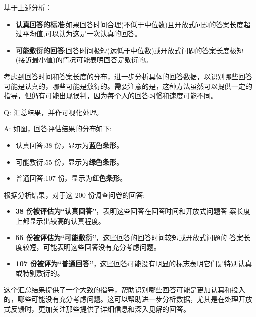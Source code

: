 基于上述分析：

\begin{itemize}
\item \textbf{认真回答的标准}:如果回答时间合理(不低于中位数)且开放式问题的答案长度超过平均值,可以认为这是一次认真的回答。
\item \textbf{可能敷衍的回答}:回答时间极短(远低于中位数)或开放式问题的答案长度极短(接近最小值)的情况可能表明回答是敷衍的。
\end{itemize}

考虑到回答时间和答案长度的分布，进一步分析具体的回答数据，以识别哪些回答可能是认真的，哪些可能是敷衍的。需要注意的是，这种方法虽然可以提供一定的指导，但仍有可能出现误判，因为每个人的回答习惯和速度可能不同。

Q:
汇总结果，并作可视化处理。

A:
如图，回答评估结果的分布如下:
\begin{itemize}
\item 认真回答:38 份，显示为\textbf{蓝色条形}。
\item 可能敷衍:55 份，显示为\textbf{绿色条形}。
\item 普通回答:107 份，显示为\textbf{红色条形}。
\end{itemize}

根据分析结果，对于这 200 份调查问卷的回答:
\begin{itemize}
\item \textbf{38 份被评估为“认真回答”}，表明这些回答在回答时间和开放式问题答
案长度上都显示出较高的认真程度。

\item \textbf{55 份被评估为“可能敷衍”}，这些回答的回答时间较短或开放式问题的
答案长度较短，可能表明这些回答没有充分考虑问题。

\item \textbf{107 份被评为“普通回答”}，这些回答可能没有明显的标志表明它们是特别认真或特别敷衍的。 
\end{itemize}
这个汇总结果提供了一个大致的指导，帮助识别哪些回答可能是更加认真和投入的，哪些可能没有充分考虑问题。这可以帮助进一步分析数据，尤其是在处理开放式反馈时，更加关注那些提供了详细信息和深入见解的回答。